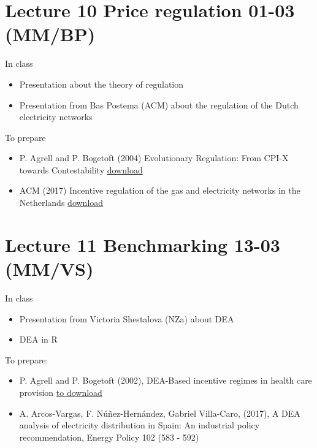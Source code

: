 \documentclass[]{book}
\providecommand{\tightlist}{%
  \setlength{\itemsep}{0pt}\setlength{\parskip}{0pt}}
\begin{document}
\section{Lecture 10 Price regulation 01-03
(MM/BP)}\label{lecture-10-price-regulation-01-03-mmbp}

In class

\begin{itemize}
\tightlist
\item
  Presentation about the theory of regulation
\item
  Presentation from Bas Postema (ACM) about the regulation of the Dutch
  electricity networks
\end{itemize}

To prepare

\begin{itemize}
\item
  P. Agrell and P. Bogetoft (2004) Evolutionary Regulation: From CPI-X
  towards Contestability
  \href{https://www.sumicsid.com/reg/papers/encore.pdf}{download}
\item
  ACM (2017) Incentive regulation of the gas and electricity networks in
  the Netherlands
  \href{https://www.acm.nl/sites/default/files/old_publication/publicaties/17231_incentive-regulation-of-the-gas-and-elektricity-networks-in-the-netherlands-2017-05-17.pdf}{download}
\end{itemize}

\section{Lecture 11 Benchmarking 13-03
(MM/VS)}\label{lecture-11-benchmarking-13-03-mmvs}

In class

\begin{itemize}
\tightlist
\item
  Presentation from Victoria Shestalova (NZa) about DEA
\item
  DEA in R
\end{itemize}

To prepare:

\begin{itemize}
\tightlist
\item
  P. Agrell and P. Bogetoft (2002), DEA-Based incentive regimes in
  health care provision
  \href{https://www.researchgate.net/profile/Peter_Bogetoft/publication/23515165_DEA-Based_Incentive_Regimes_in_Health-Care_Provision/links/0912f50ae2f961fe8b000000.pdf}{to
  download}
\item
  A. Arcos-Vargas, F. Núñez-Hernández, Gabriel Villa-Caro, (2017), A DEA
  analysis of electricity distribution in Spain: An industrial policy
  recommendation, Energy Policy 102 (583 - 592)
\end{itemize}
\end{document}
